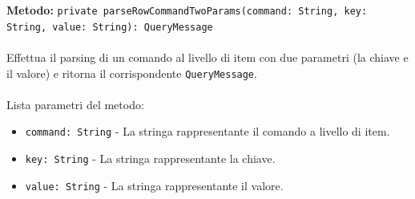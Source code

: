 \documentclass[a4paper]{article}
\begin{document}
			\textbf{Metodo: }\texttt{private parseRowCommandTwoParams(command: String, key: String, value: String): QueryMessage}
			\\ \\
			Effettua il parsing di un comando al livello di item con due parametri (la chiave e il valore) e ritorna il corrispondente \texttt{QueryMessage}.
			\\ \\
			Lista parametri del metodo:
			\begin{itemize}
				\item \texttt{command: String} - La stringa rappresentante il comando a livello di item.
				\item \texttt{key: String} - La stringa rappresentante la chiave.
				\item \texttt{value: String} - La stringa rappresentante il valore.
			\end{itemize}
			
			
\end{document}
